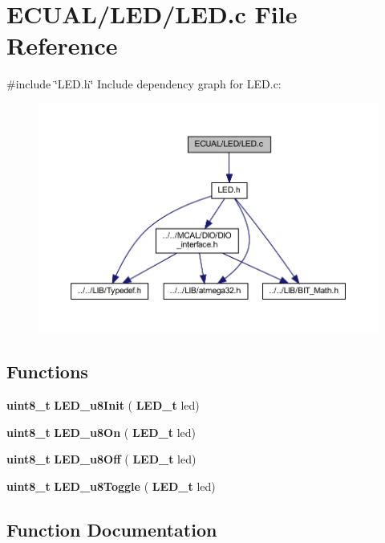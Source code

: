 \section{E\+C\+U\+A\+L/\+L\+E\+D/\+L\+ED.c File Reference}
\label{_l_e_d_8c}
{\ttfamily \#include \char`\"{}L\+E\+D.\+h\char`\"{}}\newline
Include dependency graph for L\+E\+D.\+c\+:\nopagebreak
\begin{figure}[H]
\begin{center}
\leavevmode
\includegraphics[width=350pt]{_l_e_d_8c__incl}
\end{center}
\end{figure}
\subsection*{Functions}
\begin{DoxyCompactItemize}
\item 
\textbf{ uint8\+\_\+t} \textbf{ L\+E\+D\+\_\+u8\+Init} (\textbf{ L\+E\+D\+\_\+t} led)
\item 
\textbf{ uint8\+\_\+t} \textbf{ L\+E\+D\+\_\+u8\+On} (\textbf{ L\+E\+D\+\_\+t} led)
\item 
\textbf{ uint8\+\_\+t} \textbf{ L\+E\+D\+\_\+u8\+Off} (\textbf{ L\+E\+D\+\_\+t} led)
\item 
\textbf{ uint8\+\_\+t} \textbf{ L\+E\+D\+\_\+u8\+Toggle} (\textbf{ L\+E\+D\+\_\+t} led)
\end{DoxyCompactItemize}


\subsection{Function Documentation}
\mbox{\label{_l_e_d_8c_a5ffbd3f57e696c662ae3ae52b119e867}} 
